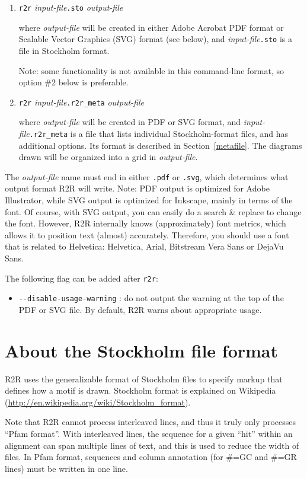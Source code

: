 \documentclass[letterpaper,12pt]{report}
\begin{document}
\begin{enumerate}
\item {\tt r2r} {\it input-file}{\tt .sto} {\it output-file}

where {\it output-file} will be created in either Adobe Acrobat PDF format or Scalable Vector Graphics (SVG) format (see below),
and {\it input-file}{\tt .sto} is a file in Stockholm format.

Note: some functionality is not available in this command-line format, so option \#2 below is preferable.
\item {\tt r2r} {\it input-file}{\tt .r2r\_meta} {\it output-file}

where {\it output-file} will be created in PDF or SVG format,
and {\it input-file}{\tt .r2r\_meta} is a file that lists individual Stockholm-format files,
and has additional options.
Its format is described in Section~\ref{metafile}.
The diagrams drawn will be organized into a grid in {\it output-file}.
\end{enumerate}

The {\it output-file} name must end in either {\tt .pdf} or {\tt .svg}, which determines what output format
R2R will write.
Note: PDF output is optimized for Adobe Illustrator, while SVG output is optimized for Inkscape, mainly in terms
of the font.
Of course, with SVG output, you can easily do a search \& replace to change the font.
However, R2R internally knows (approximately) font metrics, which allows it to position text (almost) accurately.
Therefore, you should use a font that is related to Helvetica: Helvetica, Arial, Bitstream Vera Sans or DejaVu Sans.

The following flag can be added after {\tt r2r}:
\begin{itemize}
\item {\tt -{}-disable-usage-warning} : do not output the warning at the top of the PDF or SVG file.  By default, R2R warns about appropriate usage.
\end{itemize}

\section{About the Stockholm file format}

R2R uses the generalizable format of Stockholm files to specify markup that defines how a motif is drawn.
Stockholm format is explained on Wikipedia (\url{http://en.wikipedia.org/wiki/Stockholm_format}).

Note that R2R cannot process interleaved lines, and thus it truly only processes ``Pfam format''.  With interleaved lines, the sequence for a given ``hit'' within an alignment can span multiple lines of text, and this is used to reduce the width of files.  In Pfam format, sequences and column annotation (for \#=GC and \#=GR lines) must be written in one line.
\end{document}
